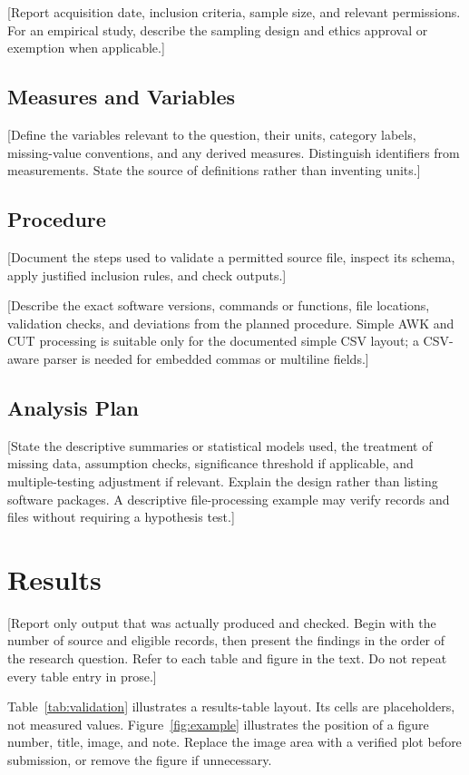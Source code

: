 \documentclass[12pt,letterpaper]{article}
\begin{document}
[Report acquisition date, inclusion criteria, sample size, and relevant
permissions. For an empirical study, describe the sampling design and ethics
approval or exemption when applicable.]

\subsection{Measures and Variables}
[Define the variables relevant to the question, their units, category labels,
missing-value conventions, and any derived measures. Distinguish identifiers
from measurements. State the source of definitions rather than inventing units.]

\subsection{Procedure}
[Document the steps used to validate a permitted source file, inspect its
schema, apply justified inclusion rules, and check outputs.]

[Describe the exact software versions, commands or functions, file locations,
validation checks, and deviations from the planned procedure. Simple AWK and
CUT processing is suitable only for the documented simple CSV layout; a
CSV-aware parser is needed for embedded commas or multiline fields.]

\subsection{Analysis Plan}
[State the descriptive summaries or statistical models used, the treatment of
missing data, assumption checks, significance threshold if applicable, and
multiple-testing adjustment if relevant. Explain the design rather than
listing software packages. A descriptive file-processing example may verify records and files without
requiring a hypothesis test.]

\section{Results}
[Report only output that was actually produced and checked. Begin with the
number of source and eligible records, then present the findings in the order
of the research question. Refer to each table and figure in the text. Do not
repeat every table entry in prose.]

Table~\ref{tab:validation} illustrates a results-table layout. Its cells are
placeholders, not measured values. Figure~\ref{fig:example} illustrates the
position of a figure number, title, image, and note. Replace the image area
with a verified plot before submission, or remove the figure if unnecessary.
\end{document}
